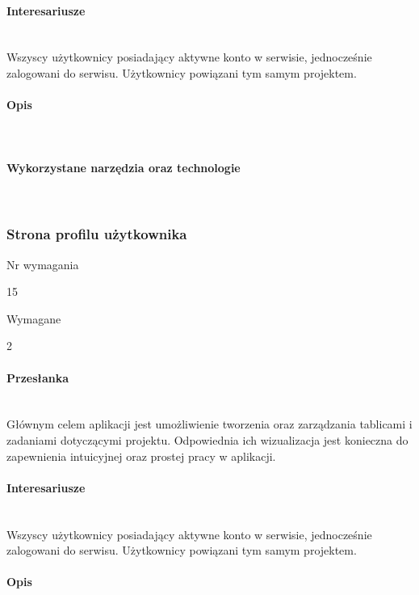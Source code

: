\documentclass[eng,printmode]{mgr}
\begin{document}
\paragraph{Interesariusze}\ \\
Wszyscy użytkownicy posiadający aktywne konto w serwisie, jednocześnie zalogowani do serwisu. Użytkownicy powiązani tym samym projektem.

\paragraph{Opis}\ \\

\paragraph{Wykorzystane narzędzia oraz technologie}\ \\
\newpage

\subsubsection{Strona profilu użytkownika}
\begin{labeling}{Nr wymagania}
\item [Nr wymagania:] 15
\item [Typ:] Wymagane
\item [Powiązania:] 2
\end{labeling}

\paragraph{Przesłanka}\ \\
Głównym celem aplikacji jest umożliwienie tworzenia oraz zarządzania tablicami i zadaniami dotyczącymi projektu. Odpowiednia ich wizualizacja jest konieczna do zapewnienia intuicyjnej oraz prostej pracy w aplikacji.

\paragraph{Interesariusze}\ \\
Wszyscy użytkownicy posiadający aktywne konto w serwisie, jednocześnie zalogowani do serwisu. Użytkownicy powiązani tym samym projektem.

\paragraph{Opis}\ \\
\newpage
\end{document}
